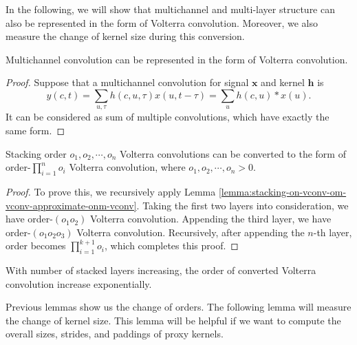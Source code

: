 \documentclass[twoside,11pt]{article}
\def\tvar#1{\mathbf{#1}} %
\begin{document}
In the following, we will show that multichannel and multi-layer structure can also be represented in the form of Volterra convolution.
Moreover, we also measure the change of kernel size during this conversion. %

\begin{lemma}
  Multichannel convolution can be represented in the form of Volterra convolution.
  \label{lemma:multi-channel-convolution-vconv}
\end{lemma}
\begin{proof}
  Suppose that a multichannel convolution for signal \(\tvar{x}\) and kernel \(\tvar{h}\) is
  \begin{equation*}
    y(c,t)
    = \sum_{u, \tau} h(c,u,\tau) x(u, t - \tau)
    = \sum_{u} h(c, u) * x(u).
  \end{equation*}
  It can be considered as sum of multiple convolutions, which have exactly the same form.
\end{proof}

\begin{lemma}
  Stacking order \(o_1, o_2, \cdots, o_n\) Volterra convolutions can be converted to the form of order-\(\prod_{i=1}^{n} o_i\) Volterra convolution, where \(o_1, o_2, \cdots, o_n > 0\).
  \label{lemma:stacking-low-order-vconv-to-high-order-vconv}
\end{lemma}

\begin{proof}
  To prove this, we recursively apply Lemma \ref{lemma:stacking-on-vconv-om-vconv-approximate-onm-vconv}.
  Taking the first two layers into consideration, we have order-\((o_1 o_2)\) Volterra convolution.
  Appending the third layer, we have order-\((o_1 o_2 o_3)\) Volterra convolution.
  Recursively, after appending the \(n\)-th layer, order becomes \(\prod_{i=1}^{k+1}o_i\), which completes this proof.
\end{proof}

\begin{remark}
  With number of stacked layers increasing, the order of converted Volterra convolution increase exponentially.
  \label{remark:number-of-layers-exp-order-of-volterra}
\end{remark}

Previous lemmas show us the change of orders. The following lemma will measure the change of kernel size. This lemma will be helpful if we want to compute the overall sizes, strides, and paddings of proxy kernels.
\end{document}
